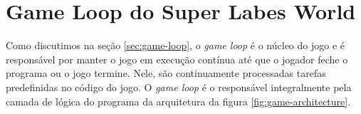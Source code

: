 
\clearpage
\section{Game Loop do Super Labes World}
\label{sec:game-loop-super-labes-world}

Como discutimos na seção \ref{sec:game-loop}, o \textit{game loop} é o núcleo do jogo e é responsável por manter o jogo em execução contínua até que o jogador feche o programa ou o jogo termine. Nele, são continuamente processadas tarefas predefinidas no código do jogo. O \textit{game loop} é o responsável integralmente pela camada de lógica do programa da arquitetura da figura \ref{fig:game-architecture}.



